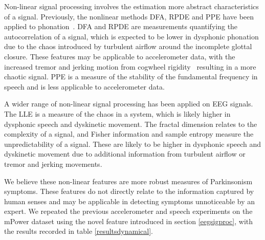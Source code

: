 \documentclass[12pt, twoside]{book}
\begin{document}
Non-linear signal processing involves the estimation more abstract characteristics of a signal. Previously, the nonlinear methods DFA, RPDE and PPE have been applied to phonation~\cite{splittlenonlinear2007,splittledysphonia2009}. DFA and RPDE are measurements quantifying the autocorrelation of a signal, which is expected to be lower in dysphonic phonation due to the chaos introduced by turbulent airflow around the incomplete glottal closure. These features may be applicable to accelerometer data, with the increased tremor and jerking motion from cogwheel rigidity~\cite{cogwheel} resulting in a more chaotic signal. PPE is a measure of the stability of the fundamental frequency in speech and is less applicable to accelerometer data.

A wider range of non-linear signal processing has been applied on EEG signals. The LLE is a measure of the chaos in a system, which is likely higher in dysphonic speech and dyskinetic movement. The fractal dimension relates to the complexity of a signal, and Fisher information and sample entropy measure the unpredictability of a signal. These are likely to be higher in dysphonic speech and dyskinetic movement due to additional information from turbulent airflow or tremor and jerking movements. 

We believe these non-linear features are more robust measures of Parkinsonism symptoms. These features do not directly relate to the information captured by human senses and may be applicable in detecting symptoms unnoticeable by an expert. We repeated the previous accelerometer and speech experiments on the mPower dataset using the novel feature introduced in section \ref{eegsigproc}, with the results recorded in table \ref{resultsdynamical}.
\end{document}
